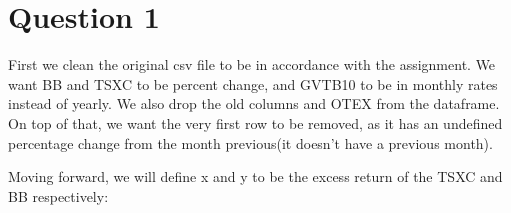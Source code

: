 \documentclass[
]{article}
\newenvironment{Shaded}{\begin{snugshade}}{\end{snugshade}}
\newcommand{\DecValTok}[1]{\textcolor[rgb]{0.00,0.00,0.81}{#1}}
\newcommand{\FunctionTok}[1]{\textcolor[rgb]{0.13,0.29,0.53}{\textbf{#1}}}
\newcommand{\NormalTok}[1]{#1}
\newcommand{\OtherTok}[1]{\textcolor[rgb]{0.56,0.35,0.01}{#1}}
\newcommand{\SpecialCharTok}[1]{\textcolor[rgb]{0.81,0.36,0.00}{\textbf{#1}}}
\newcommand{\StringTok}[1]{\textcolor[rgb]{0.31,0.60,0.02}{#1}}
\begin{document}
\section{Question 1}\label{question-1}

First we clean the original csv file to be in accordance with the
assignment. We want BB and TSXC to be percent change, and GVTB10 to be
in monthly rates instead of yearly. We also drop the old columns and
OTEX from the dataframe. On top of that, we want the very first row to
be removed, as it has an undefined percentage change from the month
previous(it doesn't have a previous month).

\begin{Shaded}
\end{Shaded}

Moving forward, we will define x and y to be the excess return of the
TSXC and BB respectively:
\end{document}
